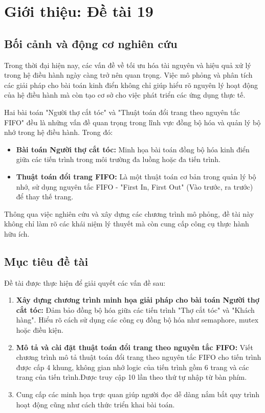 \chapter{Giới thiệu: Đề tài 19}
\label{Chapter1}

\section{Bối cảnh và động cơ nghiên cứu}
Trong thời đại hiện nay, các vấn đề về tối ưu hóa tài nguyên và hiệu quả xử lý trong hệ điều hành ngày càng trở nên quan trọng. Việc mô phỏng và phân tích các giải pháp cho bài toán kinh điển không chỉ giúp hiểu rõ nguyên lý hoạt động của hệ điều hành mà còn tạo cơ sở cho việc phát triển các ứng dụng thực tế.  

Hai bài toán "Người thợ cắt tóc" và "Thuật toán đổi trang theo nguyên tắc FIFO" đều là những vấn đề quan trọng trong lĩnh vực đồng bộ hóa và quản lý bộ nhớ trong hệ điều hành. Trong đó:

\begin{itemize}
    \item \textbf{Bài toán Người thợ cắt tóc:} Minh họa bài toán đồng bộ hóa kinh điển giữa các tiến trình trong môi trường đa luồng hoặc đa tiến trình.
    \item \textbf{Thuật toán đổi trang FIFO:} Là một thuật toán cơ bản trong quản lý bộ nhớ, sử dụng nguyên tắc FIFO - "First In, First Out" (Vào trước, ra trước) để thay thế trang.
\end{itemize}

Thông qua việc nghiên cứu và xây dựng các chương trình mô phỏng, đề tài này không chỉ làm rõ các khái niệm lý thuyết mà còn cung cấp công cụ thực hành hữu ích.

\section{Mục tiêu đề tài}
Đề tài được thực hiện để giải quyết các vấn đề sau:  
\begin{enumerate}
    \item \textbf{Xây dựng chương trình minh họa giải pháp cho bài toán Người thợ cắt tóc:}  
    Đảm bảo đồng bộ hóa giữa các tiến trình "Thợ cắt tóc" và "Khách hàng". Hiểu rõ cách sử dụng các công cụ đồng bộ hóa như semaphore, mutex hoặc điều kiện.  
    \item \textbf{Mô tả và cài đặt thuật toán đổi trang theo nguyên tắc FIFO:}  
    Viết chương trình mô tả thuật toán đổi trang theo nguyên tắc FIFO cho tiến trình được cấp 4 khung, không gian nhớ logic của tiến trình gồm 6 trang và các trang của tiến trình.Được truy cập 10 lần theo thứ tự nhập từ bàn phím.
    \item Cung cấp các minh họa trực quan giúp người đọc dễ dàng nắm bắt quy trình hoạt động cũng như cách thức triển khai bài toán.
\end{enumerate}

